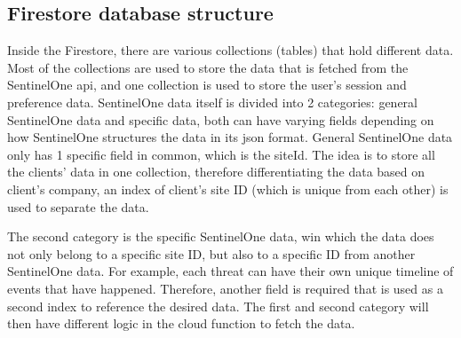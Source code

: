 \subsection{Firestore database structure}

Inside the Firestore, there are various collections (tables) that hold different data. Most of the collections are used to store the
data that is fetched from the SentinelOne \acrshort{api}, and one collection is used to store the user's session and preference data.
SentinelOne data itself is divided into 2 categories: general SentinelOne data and specific data, both can have varying fields
depending on how SentinelOne structures the data in its \acrshort{json} format. General SentinelOne data only has 1 specific field
in common, which is the siteId. The idea is to store all the clients' data in one collection, therefore differentiating the data
based on client's company, an index of client's site ID (which is unique from each other) is used to separate the data.

The second category is the specific SentinelOne data, win which the data does not only belong to a specific site ID, but also to a
specific ID from another SentinelOne data. For example, each threat can have their own unique timeline of events that have happened.
Therefore, another field is required that is used as a second index to reference the desired data. The first and second category will
then have different logic in the cloud function to fetch the data.



